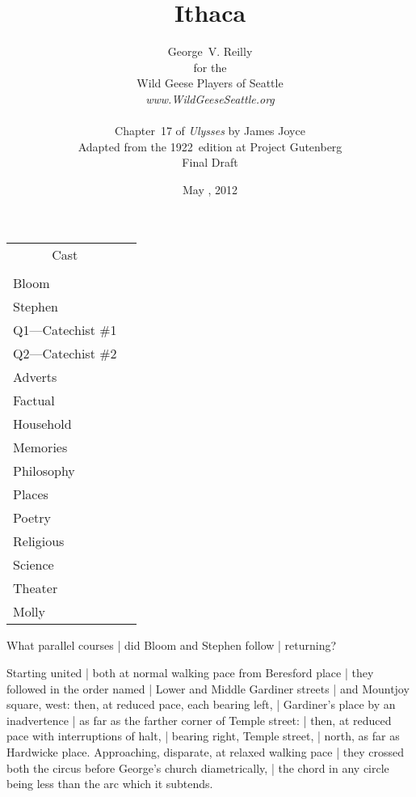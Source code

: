 



\title{\Huge Ithaca}
\author{George~V. Reilly\\
{\small for the}\\
Wild Geese Players of Seattle\\
{\emph{www.WildGeeseSeattle.org}}\\
\\
{\small Chapter~17 of \emph{Ulysses} by James Joyce}\\
{\small Adapted from the 1922~edition at Project Gutenberg}
\\
{\small Final Draft}}
\date{May , 2012}
\raggedbottom



\maketitle
\thispagestyle{empty}
\pagebreak

\begin{tabular}{ll}
\multicolumn{1}{c}{\large Cast} \\
\\
Bloom \\
Stephen \\
Q1---Catechist \#1\\
Q2---Catechist \#2 \\
Adverts \\
Factual \\
Household \\
Memories \\
Philosophy \\
Places \\
Poetry \\
Religious \\
Science \\
Theater \\
Molly
\end{tabular}

\newpage


\setcounter{page}{1}


What parallel courses |
did Bloom and Stephen follow |
returning?

\Places
Starting united |
both at normal walking pace from Beresford place |
they followed in the order named |
Lower and Middle Gardiner streets |
and Mountjoy square, west:
then, at reduced pace, each bearing left, |
Gardiner's place by an inadvertence |
as far as the farther corner of Temple street: |
then, at reduced pace with interruptions of halt, |
bearing right, Temple street, |
north, as far as Hardwicke place.
Approaching, disparate, at relaxed walking pace |
they crossed both the circus before George's church diametrically, |
the chord in any circle being less than the arc which it subtends.%


